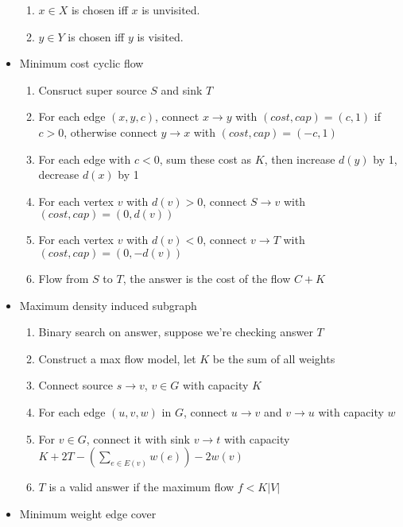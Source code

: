 \documentclass[10pt, a4paper, twocolumn, oneside]{article}
\begin{document}
\begin{itemize}
\begin{enumerate}
        \item $x \in X$ is chosen iff $x$ is unvisited.
        \item $y \in Y$ is chosen iff $y$ is visited.
    \end{enumerate}
    \item Minimum cost cyclic flow
    \vspace{-0.5em}
    \begin{enumerate}
        \itemsep-0.3em
        \item Consruct super source $S$ and sink $T$
        \item For each edge $(x, y, c)$, connect $x \rightarrow y$ with $(cost, cap) = (c, 1)$ if $c > 0$, otherwise connect $y \rightarrow x$ with $(cost, cap) = (-c, 1)$
        \item For each edge with $c < 0$, sum these cost as $K$, then increase $d(y)$ by 1, decrease $d(x)$ by 1
        \item For each vertex $v$ with $d(v) > 0$, connect $S \rightarrow v$ with $(cost, cap) = (0, d(v))$
        \item For each vertex $v$ with $d(v) < 0$, connect $v \rightarrow T$ with $(cost, cap) = (0, -d(v))$
        \item Flow from $S$ to $T$, the answer is the cost of the flow $C + K$
    \end{enumerate}
    \item Maximum density induced subgraph
    \vspace{-1em}
    \begin{enumerate}
        \itemsep-0.3em
        \item Binary search on answer, suppose we're checking answer $T$
        \item Construct a max flow model, let $K$ be the sum of all weights
        \item Connect source $s \rightarrow v$, $v \in G$ with capacity $K$
        \item For each edge $(u, v, w)$ in $G$, connect $u \rightarrow v$ and $v \rightarrow u$ with capacity $w$
        \item For $v \in G$, connect it with sink $v \rightarrow t$ with capacity $K + 2T - (\sum_{e \in E(v)}{w(e)}) - 2w(v)$
        \item $T$ is a valid answer if the maximum flow $f < K \lvert V \rvert$
    \end{enumerate}
    \item Minimum weight edge cover
    \vspace{-1em}

\end{itemize}
\end{document}
